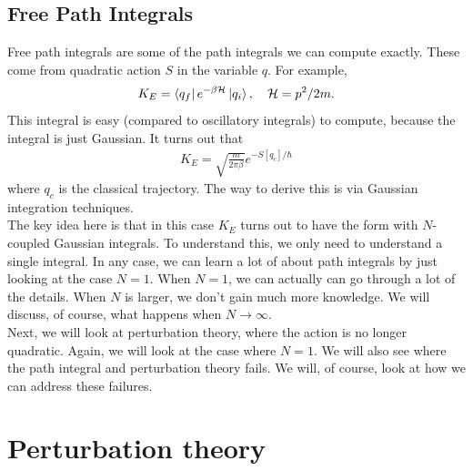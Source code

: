 \documentclass{book}
\theoremstyle{definition}
\newcommand{\had}{\mathcal{H}}
\newcommand{\f}[2]{\frac{#1}{#2}}
\begin{document}
\subsection{Free Path Integrals}

Free path integrals are some of the path integrals we can compute exactly. These come from quadratic action $S$ in the variable $q$. For example,
\begin{align}
K_E = \bra{q_f}  e^{-\beta \had}  \ket{q_i}, \quad \had = p^2/2m.
\end{align}
This integral is easy (compared to oscillatory integrals) to compute, because the integral is just Gaussian. It turns out that
\begin{align}
K_E = \sqrt{\f{m}{2\pi \beta}} e^{-S[q_c]/\hbar} 
\end{align}
where $q_c$ is the classical trajectory. The way to derive this is via Gaussian integration techniques. \\


The key idea here is that in this case $K_E$ turns out to have the form with $N$-coupled Gaussian integrals. To understand this, we only need to understand a single integral. In any case, we can learn a lot of about path integrals by just looking at the case $N=1$. When $N=1$, we can actually can go through a lot of the details. When $N$ is larger, we don't gain much more knowledge. We will discuss, of course, what happens when $N \to \infty$. \\


Next, we will look at perturbation theory, where the action is no longer quadratic. Again, we will look at the case where $N=1$. We will also see where the path integral and perturbation theory fails. We will, of course, look at how we can address these failures. 




















\newpage

\section{Perturbation theory}
\end{document}

